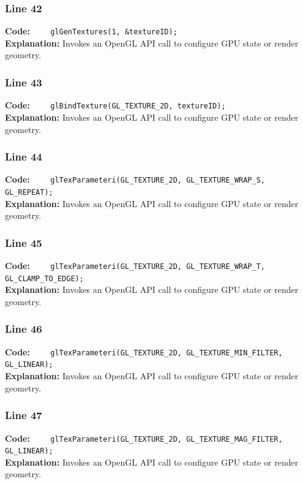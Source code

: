 \documentclass[11pt,a4paper]{article}
\begin{document}
\subsubsection*{Line 42}
\textbf{Code:} \verb|    glGenTextures(1, &textureID);|\\
\textbf{Explanation:} Invokes an OpenGL API call to configure GPU state or render geometry.

\subsubsection*{Line 43}
\textbf{Code:} \verb|    glBindTexture(GL_TEXTURE_2D, textureID);|\\
\textbf{Explanation:} Invokes an OpenGL API call to configure GPU state or render geometry.

\subsubsection*{Line 44}
\textbf{Code:} \verb|    glTexParameteri(GL_TEXTURE_2D, GL_TEXTURE_WRAP_S, GL_REPEAT);|\\
\textbf{Explanation:} Invokes an OpenGL API call to configure GPU state or render geometry.

\subsubsection*{Line 45}
\textbf{Code:} \verb|    glTexParameteri(GL_TEXTURE_2D, GL_TEXTURE_WRAP_T, GL_CLAMP_TO_EDGE);|\\
\textbf{Explanation:} Invokes an OpenGL API call to configure GPU state or render geometry.

\subsubsection*{Line 46}
\textbf{Code:} \verb|    glTexParameteri(GL_TEXTURE_2D, GL_TEXTURE_MIN_FILTER, GL_LINEAR);|\\
\textbf{Explanation:} Invokes an OpenGL API call to configure GPU state or render geometry.

\subsubsection*{Line 47}
\textbf{Code:} \verb|    glTexParameteri(GL_TEXTURE_2D, GL_TEXTURE_MAG_FILTER, GL_LINEAR);|\\
\textbf{Explanation:} Invokes an OpenGL API call to configure GPU state or render geometry.
\end{document}
